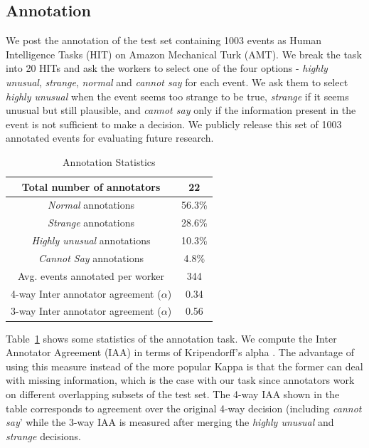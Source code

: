 \subsection{Annotation}
\label{sec:nem_annot}
We post the annotation of the test set containing 1003 events as
Human Intelligence Tasks (HIT) on Amazon Mechanical Turk (AMT).
We break the task into 20 HITs and ask the workers to select one of the 
four options - \textit{highly unusual}, \textit{strange}, \textit{normal} and 
\textit{cannot say} for each event.  We ask them to select \textit{highly
unusual} when the 
event seems too strange to be true, \textit{strange} if it seems unusual but 
still plausible, and \textit{cannot say} only if the information present in the 
event is not sufficient to make a decision.  We publicly release this set of 
1003
annotated events for evaluating future research.

\begin{table}
\begin{center}
  \begin{tabular}[c]{|c|c|}
 \hline
  Total number of annotators & 22\\
  \hline
  \textit{Normal} annotations & 56.3\% \\
  \hline
  \textit{Strange} annotations & 28.6\% \\
  \hline
  \textit{Highly unusual} annotations & 10.3\% \\
  \hline
  \textit{Cannot Say} annotations & 4.8\% \\
  \hline
  Avg. events annotated per worker & 344 \\
  \hline
  4-way Inter annotator agreement ($\alpha$) & 0.34 \\
  \hline
  3-way Inter annotator agreement ($\alpha$) & 0.56 \\
  \hline
  \end{tabular}
\end{center}
 \caption{Annotation Statistics}
 \label{table:annot}
\end{table}
Table~\ref{table:annot} shows some statistics of the annotation task.  We
compute the Inter Annotator
Agreement (IAA) in terms of Kripendorff's alpha \cite{krippendorff1980content}. 
The advantage of using this
measure instead of the more popular Kappa is that the former can deal with
missing information, which is the case with
our task since annotators work on different overlapping subsets of the test set.
 The 4-way IAA shown in the table 
corresponds to agreement over the original 4-way decision (including
\textit{cannot say}' while the 3-way IAA is measured after merging the 
\textit{highly unusual} and \textit{strange} decisions.  

